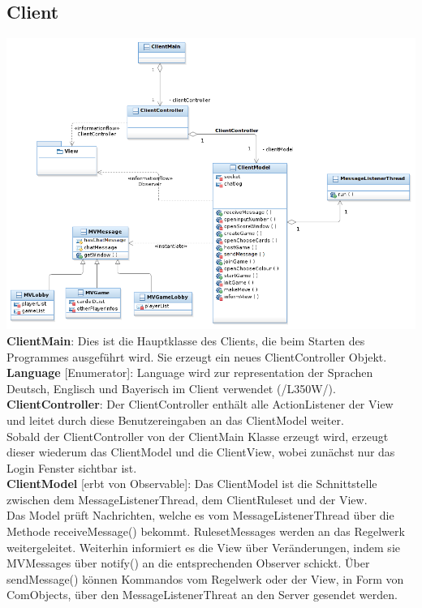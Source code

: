\documentclass{article}
\begin{document}
\subsection{Client}
\includegraphics[width=\textwidth]{Entwurf_ClientDiagram}
\textbf{ClientMain}: Dies ist die Hauptklasse des Clients, die beim Starten des Programmes ausgeführt wird. Sie erzeugt ein neues ClientController Objekt.\\

\textbf{Language} [Enumerator]: Language wird zur representation der Sprachen Deutsch, Englisch und Bayerisch im Client verwendet (/L350W/). \\

\textbf{ClientController}: Der ClientController enthält alle ActionListener der View und leitet durch diese Benutzereingaben an das ClientModel weiter.\\
Sobald der ClientController von der ClientMain Klasse erzeugt wird, erzeugt dieser wiederum das ClientModel und die ClientView, wobei zunächst nur das Login Fenster sichtbar ist. \\

\textbf{ClientModel} [erbt von Observable]: Das ClientModel ist die Schnittstelle zwischen dem MessageListenerThread, dem ClientRuleset und der View.\\ 
Das Model prüft Nachrichten, welche es vom MessageListenerThread über die Methode receiveMessage() bekommt. RulesetMessages werden an das Regelwerk weitergeleitet. Weiterhin informiert es die View über Veränderungen, indem sie MVMessages über notify() an die entsprechenden Observer schickt. Über sendMessage() können Kommandos vom Regelwerk oder der View, in Form von ComObjects, über den MessageListenerThreat an den Server gesendet werden.\\
\end{document}
